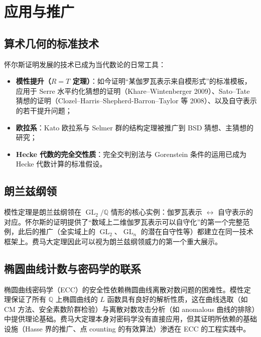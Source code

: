 \section{应用与推广}\label{sec:applications}

\subsection{算术几何的标准技术}

怀尔斯证明发展的技术已成为当代数论的日常工具：

\begin{itemize}
    \item \textbf{模性提升（$R=T$ 定理）}：如今证明“某伽罗瓦表示来自模形式”的标准模板，应用于 Serre 水平约化猜想的证明（Khare--Wintenberger 2009\cite{khare2009serre}）、Sato--Tate 猜想的证明（Clozel--Harris--Shepherd-Barron--Taylor 等 2008\cite{clozel2008sato}）、以及自守表示的若干提升问题；
    \item \textbf{欧拉系}：Kato 欧拉系与 Selmer 群的结构定理被推广到 BSD 猜想、主猜想的研究；
    \item \textbf{Hecke 代数的完全交性质}：完全交判别法与 Gorenstein 条件的运用已成为 Hecke 代数计算的标准假设。
\end{itemize}

\subsection{朗兰兹纲领}

模性定理是朗兰兹纲领在 $\operatorname{GL}_2/\mathbb{Q}$ 情形的核心实例：伽罗瓦表示 $\leftrightarrow$ 自守表示的对应。怀尔斯的证明提供了“数域上二维伽罗瓦表示可以自守化”的第一个完整范例，此后的推广（全实域上的 $\operatorname{GL}_2$、$\operatorname{GL}_n$ 的潜在自守性等）都建立在同一技术框架上。费马大定理因此可以视为朗兰兹纲领威力的第一个重大展示。

\subsection{椭圆曲线计数与密码学的联系}

椭圆曲线密码学（ECC）的安全性依赖椭圆曲线离散对数问题的困难性。模性定理保证了所有 $\mathbb{Q}$ 上椭圆曲线的 $L$ 函数具有良好的解析性质，这在曲线选取（如 CM 方法、安全素数阶群检验）与离散对数攻击分析（如 anomalous 曲线的排除）中提供理论基础。费马大定理本身对密码学没有直接应用，但其证明所依赖的基础设施（Hasse 界的推广、点 counting 的有效算法）渗透在 ECC 的工程实践中。

